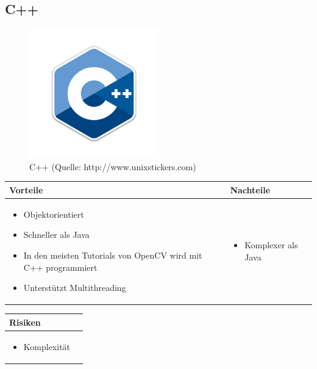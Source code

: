 \pagebreak


\subsection{C++}
\begin{figure}[h!]%
\centering
\includegraphics[width=0.5\textwidth]{fig/Cplusplus.png}
\caption{C++ (Quelle: http://www.unixstickers.com)}
\label{fig:C++}
\end{figure}
\begin{table}[h]
\begin{tabular}{p{} | p{}}


 \textbf{Vorteile} & \textbf{Nachteile} \\ \hline
	 
\begin{itemize}
\item Objektorientiert
\item Schneller als Java
\item In den meisten Tutorials von OpenCV wird mit C++ programmiert
\item Unterstützt Multithreading
\end{itemize}

 
 &
 
\begin{itemize}
\item Komplexer als Java
\end{itemize}

\end{tabular}
\end{table}

\begin{table}[h]
\begin{tabular}{p{}p{}}


 \textbf{Risiken} & \\ \hline
	 
\begin{itemize}
\item Komplexität
\end{itemize}

 
\end{tabular}
\end{table}

\pagebreak